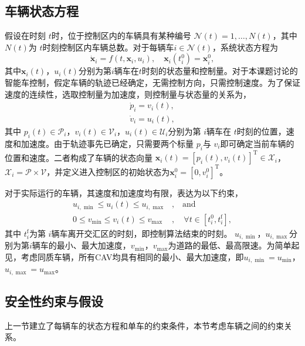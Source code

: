 \subsection{车辆状态方程}
假设在时刻 $t$时，位于控制区内的车辆具有某种编号 $\mathcal{N}(t)={1,\dots,N(t)}$，其中 $N(t)$为 $t$时刻控制区内车辆总数。对于每辆车$i\in \mathcal{N}(t)$，系统状态方程为
\begin{equation}
\dot{\bm{x}}_i=f(t,\bm{x}_i,u_i),\quad \bm{x}_i(t_i^0)=\bm{x}_i^0,
\end{equation}
其中$\bm{x}_i(t)$，$u_i(t)$分别为第$i$辆车在$t$时刻的状态量和控制量。对于本课题讨论的智能车控制，假定车辆的轨迹已经确定，无需控制方向，只需控制速度。为了保证速度的连续性，选取控制量为加速度，则控制量与状态量的关系为，
\begin{equation}
\begin{gathered}
\dot{p}_i=v_i(t),\\
\dot{v}_i=u_i(t),
\end{gathered}
\label{eq:state}
\end{equation}
其中 $p_i(t)\in \mathcal{P}_i$，$v_i(t)\in \mathcal{V}_i$，$u_i(t)\in \mathcal{U}_i$分别为第 $i$辆车在 $t$时刻的位置，速度和加速度。由于轨迹事先已确定，只需要两个标量 $p_i$与 $v_i$即可确定当前车辆的位置和速度。二者构成了车辆的状态向量 $\bm{x}_i(t)=[p_i(t), v_i(t)]^\mathrm{T}\in \mathcal{X}_i$，$\mathcal{X}_i=\mathcal{P}\times\mathcal{V}$，并定义进入控制区的初始状态为$\bm{x}_i^0 = [0, v_i^0]^\mathrm{T}$。

对于实际运行的车辆，其速度和加速度均有限，表达为以下约束，
\begin{equation}
\begin{aligned}
u_{i,\min}\leq u_i(t)\leq u_{i,\max}&, \quad \text{and}\\
0\leq v_{\min}\leq v_i(t)\leq v_{\max}&, \quad \forall t\in[t_i^0, t_i^\mathrm{f}],
\end{aligned}
\label{eq:single_constraint}
\end{equation}
其中 $t_i^\mathrm{f}$为第 $i$辆车离开交汇区的时刻，即控制算法结束的时刻。 $u_{i,\min}$，$u_{i,\max}$分别为第$i$辆车的最小、最大加速度，$v_{\min}$，$v_{\max}$为道路的最低、最高限速。为简单起见，考虑同质车辆，所有CAV均具有相同的最小、最大加速度，即$u_{i,\min}=u_{\min}$，$u_{i,\max}=u_{\max}$。

\subsection{安全性约束与假设}
上一节建立了每辆车的状态方程和单车的约束条件，本节考虑车辆之间的约束关系。


